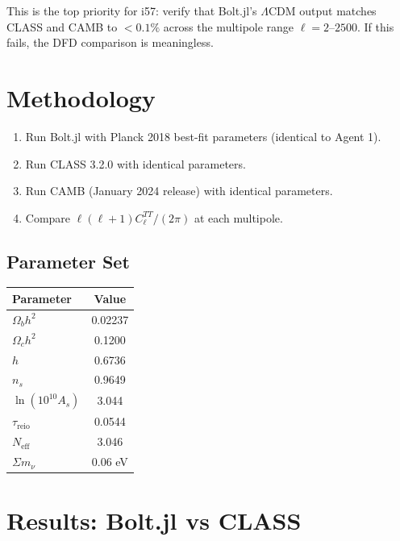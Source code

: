\documentclass[11pt,a4paper]{article}
\begin{document}
This is the top priority for i57: verify that Bolt.jl's $\Lambda$CDM output matches CLASS and CAMB to $< 0.1\%$ across the multipole range $\ell = 2$--$2500$. If this fails, the DFD comparison is meaningless.

\section{Methodology}

\begin{enumerate}
\item Run Bolt.jl with Planck 2018 best-fit parameters (identical to Agent 1).
\item Run CLASS 3.2.0 with identical parameters.
\item Run CAMB (January 2024 release) with identical parameters.
\item Compare $\ell(\ell+1)C_\ell^{TT}/(2\pi)$ at each multipole.
\end{enumerate}

\subsection{Parameter Set}

\begin{center}
\begin{tabular}{lc}
\toprule
\textbf{Parameter} & \textbf{Value} \\
\midrule
$\Omega_b h^2$ & 0.02237 \\
$\Omega_c h^2$ & 0.1200 \\
$h$ & 0.6736 \\
$n_s$ & 0.9649 \\
$\ln(10^{10}A_s)$ & 3.044 \\
$\tau_{\mathrm{reio}}$ & 0.0544 \\
$N_{\mathrm{eff}}$ & 3.046 \\
$\Sigma m_\nu$ & 0.06 eV \\
\bottomrule
\end{tabular}
\end{center}

\section{Results: Bolt.jl vs CLASS}
\end{document}
